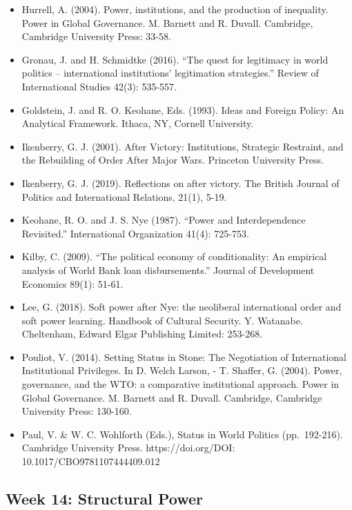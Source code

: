 \documentclass[
  letterpaper,
  DIV=11,
  numbers=noendperiod]{scrartcl}
\providecommand{\tightlist}{%
  \setlength{\itemsep}{0pt}\setlength{\parskip}{0pt}}\usepackage{longtable,booktabs,array}
\begin{document}
\begin{itemize}
\tightlist
\item
  Hurrell, A. (2004). Power, institutions, and the production of
  inequality. Power in Global Governance. M. Barnett and R. Duvall.
  Cambridge, Cambridge University Press: 33-58.
\item
  Gronau, J. and H. Schmidtke (2016). ``The quest for legitimacy in
  world politics -- international institutions' legitimation
  strategies.'' Review of International Studies 42(3): 535-557.
\item
  Goldstein, J. and R. O. Keohane, Eds. (1993). Ideas and Foreign
  Policy: An Analytical Framework. Ithaca, NY, Cornell University.
\item
  Ikenberry, G. J. (2001). After Victory: Institutions, Strategic
  Restraint, and the Rebuilding of Order After Major Wars. Princeton
  University Press.
\item
  Ikenberry, G. J. (2019). Reflections on after victory. The British
  Journal of Politics and International Relations, 21(1), 5-19.
\item
  Keohane, R. O. and J. S. Nye (1987). ``Power and Interdependence
  Revisited.'' International Organization 41(4): 725-753.
\item
  Kilby, C. (2009). ``The political economy of conditionality: An
  empirical analysis of World Bank loan disbursements.'' Journal of
  Development Economics 89(1): 51-61.
\item
  Lee, G. (2018). Soft power after Nye: the neoliberal international
  order and soft power learning. Handbook of Cultural Security. Y.
  Watanabe. Cheltenham, Edward Elgar Publishing Limited: 253-268.
\item
  Pouliot, V. (2014). Setting Status in Stone: The Negotiation of
  International Institutional Privileges. In D. Welch Larson, - T.
  Shaffer, G. (2004). Power, governance, and the WTO: a comparative
  institutional approach. Power in Global Governance. M. Barnett and R.
  Duvall. Cambridge, Cambridge University Press: 130-160.
\item
  Paul, V. \& W. C. Wohlforth (Eds.), Status in World Politics
  (pp.~192-216). Cambridge University Press. https://doi.org/DOI:
  10.1017/CBO9781107444409.012
\end{itemize}

\hypertarget{week-14-structural-power}{%
\subsection*{Week 14: Structural Power}\label{week-14-structural-power}}
\end{document}
